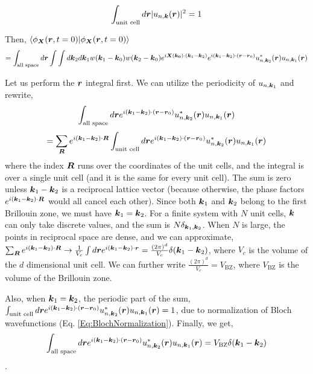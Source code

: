 \documentclass{report}
\renewcommand\vec[1]{\ensuremath\boldsymbol{#1}} %
\begin{document}
\begin{equation}\label{Eq:BlochNormalization}
	\int_{\text{unit cell}} d\vec{r} |u_{n,\vec{k}}(\vec{r})|^2 = 1
\end{equation}

Then, $\bra{\phi_{\vec{X}}(\vec{r}, t=0)}\ket{\phi_{\vec{X}}(\vec{r}, t=0)}$
$$ = \int_{\text{all space}} d\vec{r} \int \int d\vec{k}_2 d\vec{k}_1  w(\vec{k}_1 - \vec{k}_0) w(\vec{k}_2 - \vec{k}_0) e^{i \vec{X}(\vec{k_0})\cdot (\vec{k}_1 - \vec{k}_2)} e^{i (\vec{k}_1 - \vec{k}_2) \cdot (\vec{r} - \vec{r}_0) }  u^*_{n,\vec{k}_2}(\vec{r}) u_{n,\vec{k}_1}(\vec{r})$$

Let us perform the $\vec{r}$ integral first. We can utilize the periodicity of $u_{n,\vec{k}_1}$ and rewrite, 
$$\int_{\text{all space}} d\vec{r} e^{i (\vec{k}_1 - \vec{k}_2) \cdot (\vec{r} - \vec{r}_0) }  u^*_{n,\vec{k}_2}(\vec{r}) u_{n,\vec{k}_1}(\vec{r})$$
$$ =  \sum_{ \vec{R}}  e^{i (\vec{k}_1 - \vec{k}_2)\cdot \vec{R} } \int_{\text{unit cell}} d\vec{r} e^{i (\vec{k}_1 - \vec{k}_2) \cdot (\vec{r} - \vec{r}_0) }  u^*_{n,\vec{k}_2}(\vec{r}) u_{n,\vec{k}_1}(\vec{r}) $$
where the index $\vec{R}$ runs over the coordinates of the unit cells, and the integral is over a single unit cell (and it is the same for every unit cell). The sum is zero unless $\vec{k}_1 - \vec{k}_2$ is a reciprocal lattice vector (because otherwise, the phase factors $e^{i (\vec{k}_1 - \vec{k}_2)\cdot \vec{R} }$ would all cancel each other). Since both $\vec{k}_1$ and $\vec{k}_2$ belong to the first Brillouin zone, we must have $\vec{k}_1 = \vec{k}_2$.  For a finite system with $N$ unit cells, $\vec{k}$ can only take discrete values, and the sum is $N \delta_{\vec{k}_1,\vec{k}_2}$. When $N$ is large, the points in reciprocal space are dense, and we can approximate, $\sum_{ \vec{R}}  e^{i (\vec{k}_1 - \vec{k}_2)\cdot \vec{R} } \rightarrow \frac{1}{V_c} \int d \vec{r} e^{i (\vec{k}_1 - \vec{k}_2)\cdot \vec{r} } = \frac{(2 \pi)^d}{V_c} \delta (\vec{k}_1 - \vec{k}_2)$, where $V_c$ is the volume of the $d$ dimensional unit cell. We can further write $\frac{(2 \pi)^d}{V_c} = V_{\text{BZ}}$, where $V_{\text{BZ}}$ is the volume of the Brillouin zone.

Also, when $\vec{k}_1 = \vec{k}_2$, the periodic part of the sum, $\int_{\text{unit cell}} d\vec{r} e^{i (\vec{k}_1 - \vec{k}_2) \cdot (\vec{r} - \vec{r}_0) }  u^*_{n,\vec{k}_2}(\vec{r}) u_{n,\vec{k}_1}(\vec{r}) = 1$, due to normalization of Bloch wavefunctions (Eq. \eqref{Eq:BlochNormalization}). Finally, we get,
$$\int_{\text{all space}} d\vec{r} e^{i (\vec{k}_1 - \vec{k}_2) \cdot (\vec{r} - \vec{r}_0) }  u^*_{n,\vec{k}_2}(\vec{r}) u_{n,\vec{k}_1}(\vec{r}) = V_{\text{BZ}} \delta (\vec{k}_1 - \vec{k}_2) $$.
\end{document}
